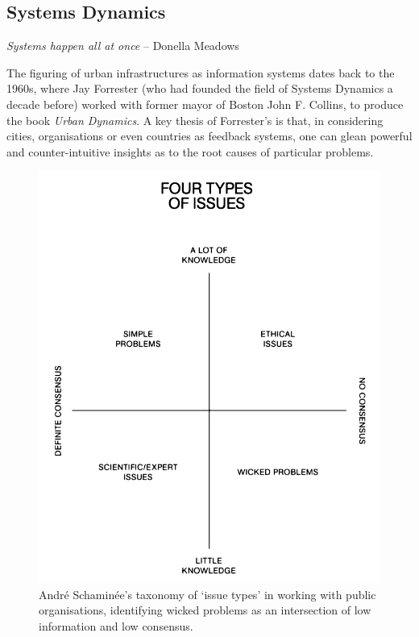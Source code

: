 \documentclass[nofonts,nols,justified,nobib]{tufte-book}
\begin{document}
\subsection*{Systems Dynamics}

\begin{flushright}
\emph{Systems happen all at once} \cite{meadows_thinking_2008}
-- Donella Meadows
\end{flushright}
The figuring of urban infrastructures as information systems dates back to the 1960s, where Jay Forrester (who had founded the field of Systems Dynamics a decade before) worked with former mayor of Boston John F. Collins, to produce the book \emph{Urban Dynamics}. A key thesis of Forrester's is that, in considering cities, organisations or even countries as feedback systems, one can glean powerful and counter-intuitive insights as to the root causes of particular problems. %

\begin{figure}
\includegraphics[width=\textwidth]{img/1/problem-types.png}
\caption{Andr\'e Schamin\'ee's taxonomy of `issue types' in working with public organisations, identifying wicked problems as an intersection of low information and low consensus. \cite{schaminee_designing_2018}}
\end{figure}
\end{document}
